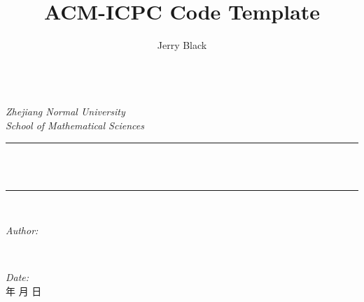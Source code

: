 \documentclass[twocolumn,a4paper]{article}  %
\title{\CJKfamily{hei} \bfseries ACM-ICPC Code Template}
\author{Jerry Black}
\renewcommand{\today}{\number\year 年 \number\month 月 \number\day 日}
\begin{document}
\small
	
\begin{titlepage}
\newcommand{\HRule}{\rule{\linewidth}{0.5mm}}
\begin{figure}[htbp]
	\centering
	\hfil
\end{figure}
\centering
\quad\\[2cm]
\textsl{\Large Zhejiang Normal University}\\[0.5cm] 
\textsl{\large School of Mathematical Sciences}\\[0.5cm] 
\makeatletter
\HRule \\[0.4cm]
{ \huge \bfseries \@title}\\[0.4cm] 
\HRule \\[1.5cm]
\begin{minipage}{0.4\textwidth}
	\begin{flushleft} \large
		\emph{Author:}\\
		\@author 
	\end{flushleft}
\end{minipage}
~
\begin{minipage}{0.4\textwidth}
	\begin{flushright} \large
		\emph{Date:} \\
		\textup{\today}
	\end{flushright}
\end{minipage}\\[3cm]
\makeatother
\vfill
\end{titlepage}
\end{document}
